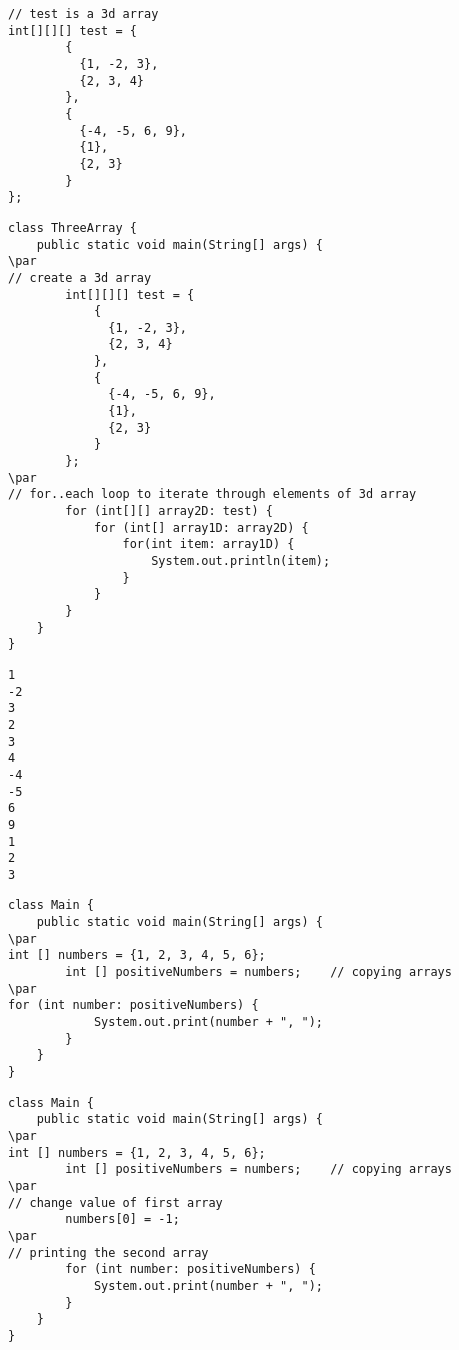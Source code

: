 \documentclass{book}
\def\lthtmlcheckvsize{\ifdim\ht\sizebox<\vsize 
  \ifdim\wd\sizebox<\hsize\expandafter\hfill\fi \expandafter\vfill
  \else\expandafter\vss\fi}%
\begin{document}
{\newpage\clearpage
{}%
\begin{lstlisting}
// test is a 3d array
int[][][] test = {
        {
          {1, -2, 3}, 
          {2, 3, 4}
        }, 
        { 
          {-4, -5, 6, 9}, 
          {1}, 
          {2, 3}
        } 
};
\end{lstlisting}%
\lthtmlfigureZ
\lthtmlcheckvsize\clearpage}

{\newpage\clearpage
{}%
\begin{lstlisting}
class ThreeArray {
    public static void main(String[] args) {
\par
// create a 3d array
        int[][][] test = {
            {
              {1, -2, 3}, 
              {2, 3, 4}
            }, 
            { 
              {-4, -5, 6, 9}, 
              {1}, 
              {2, 3}
            } 
        };
\par
// for..each loop to iterate through elements of 3d array
        for (int[][] array2D: test) {
            for (int[] array1D: array2D) {
                for(int item: array1D) {
                    System.out.println(item);
                }
            }
        }
    }
}
\end{lstlisting}%
\lthtmlfigureZ
\lthtmlcheckvsize\clearpage}

{\newpage\clearpage
{}%
\begin{lstlisting}
1
-2
3
2
3
4
-4
-5
6
9
1
2
3
\end{lstlisting}%
\lthtmlfigureZ
\lthtmlcheckvsize\clearpage}

{\newpage\clearpage
{}%
\begin{lstlisting}
class Main {
    public static void main(String[] args) {
\par
int [] numbers = {1, 2, 3, 4, 5, 6};
        int [] positiveNumbers = numbers;    // copying arrays
\par
for (int number: positiveNumbers) {
            System.out.print(number + ", ");
        }
    }
}
\end{lstlisting}%
\lthtmlfigureZ
\lthtmlcheckvsize\clearpage}

{\newpage\clearpage
{}%
\begin{lstlisting}
class Main {
    public static void main(String[] args) {
\par
int [] numbers = {1, 2, 3, 4, 5, 6};
        int [] positiveNumbers = numbers;    // copying arrays
\par
// change value of first array
        numbers[0] = -1;
\par
// printing the second array
        for (int number: positiveNumbers) {
            System.out.print(number + ", ");
        }
    }
}
\end{lstlisting}%
\lthtmlfigureZ
\lthtmlcheckvsize\clearpage}
\end{document}
